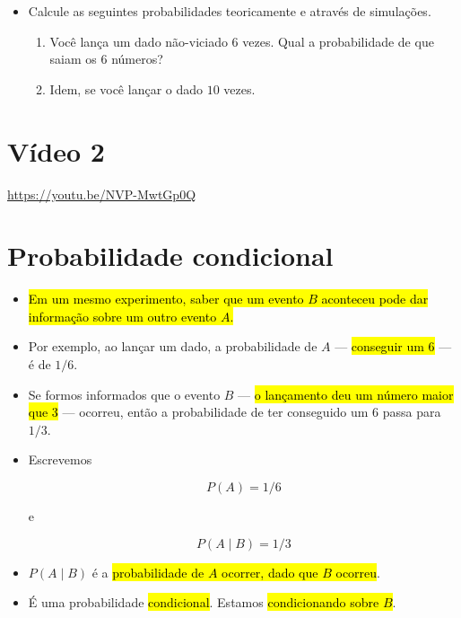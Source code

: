 \documentclass[
  11pt]{report}
\begin{document}
\begin{itemize}
\item
  Calcule as seguintes probabilidades teoricamente e através de simulações.

  \begin{enumerate}
  \def\labelenumi{\arabic{enumi}.}
  \item
    Você lança um dado não-viciado $6$ vezes. Qual a probabilidade de que saiam os $6$ números?
  \item
    Idem, se você lançar o dado $10$ vezes.
  \end{enumerate}
\end{itemize}

\hypertarget{vuxeddeo-2-3}{%
\section{Vídeo 2}\label{vuxeddeo-2-3}}

\begin{center} \url{https://youtu.be/NVP-MwtGp0Q} \end{center}

\hypertarget{probabilidade-condicional}{%
\section{Probabilidade condicional}\label{probabilidade-condicional}}

\begin{itemize}
\item
  {\hl{Em um mesmo experimento, saber que um evento $B$ aconteceu pode dar informação sobre um outro evento $A$.}}
\item
  Por exemplo, ao lançar um dado, a probabilidade de $A$ --- {\hl{conseguir um $6$}} --- é de $1/6$.
\item
  Se formos informados que o evento $B$ --- {\hl{o lançamento deu um número maior que $3$}} --- ocorreu, então a probabilidade de ter conseguido um $6$ passa para $1/3$.
\item
  Escrevemos

  \[
  P(A) = 1/6
  \]

  e

  \[
  P(A \mid B) = 1/3
  \]
\item
  $P(A \mid B)$ é a {\hl{probabilidade de $A$ ocorrer, dado que $B$ ocorreu}}.
\item
  É uma probabilidade {\hl{condicional}}. Estamos {\hl{condicionando sobre $B$}}.
\end{itemize}
\end{document}
